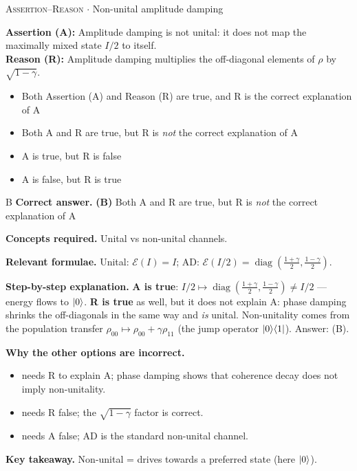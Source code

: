 \documentclass[11pt,a4paper]{article}
\newcommand{\optlabel}[1]{\textbf{(#1)}}
\newcommand{\correctlabel}[1]{\textcolor{okgreen}{\textbf{(#1)}\,\ding{51}}}
\newenvironment{qitem}[1]{\begin{list}{}{\setlength{\leftmargin}{3.3em}\setlength{\labelwidth}{3.1em}%
  \setlength{\labelsep}{0.2em}\setlength{\topsep}{3pt}\setlength{\parsep}{3pt}}\item[\textbf{Q.#1}\hfill]}{\end{list}}
\newcommand{\qsep}{\par\vspace{2pt}{\color{black!15}\hrule}\vspace{4pt}}
\newcommand{\qmeta}[2]{{\footnotesize\color{black!60}\textsc{#1} \;$\cdot$\; #2}\par}
\begin{document}
\begin{qitem}{37}
\qmeta{Assertion--Reason}{Non-unital amplitude damping}
\textbf{Assertion (A):} Amplitude damping is not unital: it does not map the maximally mixed state $I/2$ to itself.\\[1mm]
\textbf{Reason (R):} Amplitude damping multiplies the off-diagonal elements of $\rho$ by $\sqrt{1 - \gamma}$.
\begin{itemize}[leftmargin=2.6em, labelsep=0.4em, itemsep=2pt, topsep=3pt]
\item[\optlabel{A}] Both Assertion (A) and Reason (R) are true, and R is the correct explanation of A
\item[\correctlabel{B}] Both A and R are true, but R is \emph{not} the correct explanation of A
\item[\optlabel{C}] A is true, but R is false
\item[\optlabel{D}] A is false, but R is true
\end{itemize}
\end{qitem}
\begin{solbox}{B}
\textbf{\color{brand}Correct answer.} \textcolor{okgreen}{\textbf{(B)}} Both A and R are true, but R is \emph{not} the correct explanation of A

\textbf{\color{brand}Concepts required.} Unital vs non-unital channels.

\textbf{\color{brand}Relevant formulae.} Unital: $\mathcal E(I) = I$; AD: $\mathcal E(I/2) = \operatorname{diag}(\frac{1+\gamma}2, \frac{1-\gamma}2)$.

\textbf{\color{brand}Step-by-step explanation.} \textbf{A is true}: $I/2 \mapsto \operatorname{diag}(\frac{1+\gamma}{2}, \frac{1-\gamma}{2}) \neq I/2$ --- energy flows to $\ket0$.
\textbf{R is true} as well, but it does not explain A: phase damping shrinks the off-diagonals in the same way and \emph{is} unital. Non-unitality
comes from the population transfer $\rho_{00} \mapsto \rho_{00} + \gamma\rho_{11}$ (the jump operator $\ket0\!\bra1$). Answer: (B).

\textbf{\color{brand}Why the other options are incorrect.}
\begin{itemize}[leftmargin=2.4em, itemsep=1pt, topsep=2pt]
\item[\textbf{(A)}] needs R to explain A; phase damping shows that coherence decay does not imply non-unitality.
\item[\textbf{(C)}] needs R false; the $\sqrt{1-\gamma}$ factor is correct.
\item[\textbf{(D)}] needs A false; AD is the standard non-unital channel.
\end{itemize}
\textbf{\color{brand}Key takeaway.} Non-unital = drives towards a preferred state (here $\ket0$).
\end{solbox}
\qsep
\end{document}
